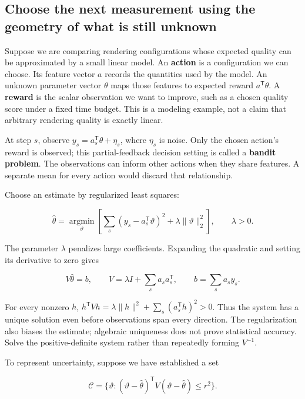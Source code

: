 \subsection{Choose the next measurement using the geometry of what is still unknown}\label{02-foundations-ii-ch030-choose-the-next-measurement-using-the-geometry-of-what-is-still-unknown}

Suppose we are comparing rendering configurations whose expected quality can be approximated by a small linear model. An \textbf{action} is a configuration we can choose. Its feature vector \(a\) records the quantities used by the model. An unknown parameter vector \(\theta\) maps those features to expected reward \(a^{\mathsf T}\theta\). A \textbf{reward} is the scalar observation we want to improve, such as a chosen quality score under a fixed time budget. This is a modeling example, not a claim that arbitrary rendering quality is exactly linear.

At step \(s\), observe \(y_s=a_s^{\mathsf T}\theta+\eta_s\), where \(\eta_s\) is noise. Only the chosen action's reward is observed; this partial-feedback decision setting is called a \textbf{bandit problem}. The observations can inform other actions when they share features. A separate mean for every action would discard that relationship.

Choose an estimate by regularized least squares:

\[
\widehat\theta=\underset{\vartheta}{\operatorname{argmin}}
\left[\sum_s(y_s-a_s^{\mathsf T}\vartheta)^2
+\lambda\|\vartheta\|_2^2\right],\qquad\lambda>0.
\]

The parameter \(\lambda\) penalizes large coefficients. Expanding the quadratic and setting its derivative to zero gives

\[
V\widehat\theta=b,\qquad
V=\lambda I+\sum_s a_sa_s^{\mathsf T},\qquad
b=\sum_s a_sy_s.
\]

For every nonzero \(h\), \(h^{\mathsf T}Vh=\lambda\|h\|^2+\sum_s(a_s^{\mathsf T}h)^2>0\). Thus the system has a unique solution even before observations span every direction. The regularization also biases the estimate; algebraic uniqueness does not prove statistical accuracy. Solve the positive-definite system rather than repeatedly forming \(V^{-1}\).

To represent uncertainty, suppose we have established a set

\[
\mathcal C=\{\vartheta:
(\vartheta-\widehat\theta)^{\mathsf T}V
(\vartheta-\widehat\theta)\le r^2\}.
\]

